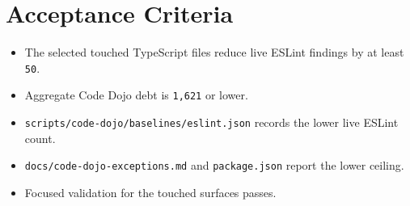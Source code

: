 \section{Acceptance Criteria}\label{record-224-acceptance-criteria}

\begin{itemize}
\tightlist
\item
  The selected touched TypeScript files reduce live ESLint findings by at least \texttt{5\allowbreak{}0}.
\item
  Aggregate Code Dojo debt is \texttt{1\allowbreak{},\allowbreak{}6\allowbreak{}2\allowbreak{}1} or lower.
\item
  \texttt{s\allowbreak{}c\allowbreak{}r\allowbreak{}i\allowbreak{}p\allowbreak{}t\allowbreak{}s\allowbreak{}/\allowbreak{}c\allowbreak{}o\allowbreak{}d\allowbreak{}e\allowbreak{}-\allowbreak{}d\allowbreak{}o\allowbreak{}j\allowbreak{}o\allowbreak{}/\allowbreak{}b\allowbreak{}a\allowbreak{}s\allowbreak{}e\allowbreak{}l\allowbreak{}i\allowbreak{}n\allowbreak{}e\allowbreak{}s\allowbreak{}/\allowbreak{}e\allowbreak{}s\allowbreak{}l\allowbreak{}i\allowbreak{}n\allowbreak{}t\allowbreak{}.\allowbreak{}j\allowbreak{}s\allowbreak{}o\allowbreak{}n} records the lower live ESLint count.
\item
  \texttt{d\allowbreak{}o\allowbreak{}c\allowbreak{}s\allowbreak{}/\allowbreak{}c\allowbreak{}o\allowbreak{}d\allowbreak{}e\allowbreak{}-\allowbreak{}d\allowbreak{}o\allowbreak{}j\allowbreak{}o\allowbreak{}-\allowbreak{}e\allowbreak{}x\allowbreak{}c\allowbreak{}e\allowbreak{}p\allowbreak{}t\allowbreak{}i\allowbreak{}o\allowbreak{}n\allowbreak{}s\allowbreak{}.\allowbreak{}m\allowbreak{}d} and \texttt{p\allowbreak{}a\allowbreak{}c\allowbreak{}k\allowbreak{}a\allowbreak{}g\allowbreak{}e\allowbreak{}.\allowbreak{}j\allowbreak{}s\allowbreak{}o\allowbreak{}n} report the lower ceiling.
\item
  Focused validation for the touched surfaces passes.
\end{itemize}

